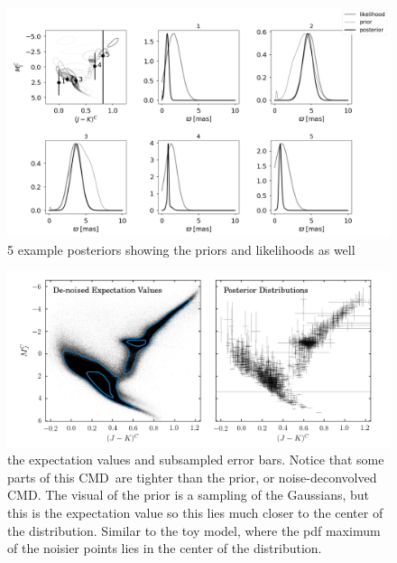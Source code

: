 \documentclass[modern]{aastex61}
\newcommand{\acronym}[1]{{\small{#1}}}
\newcommand{\cmd}{\acronym{CMD}}
\begin{document}
\begin{figure}
\centering
  \includegraphics[width=\textwidth]{posterior.png}
\caption{5 example posteriors showing the priors and likelihoods as well}
\label{fig:posterior}
\end{figure}


\begin{figure}
\centering
  \includegraphics[width=\textwidth]{posteriorCMD.png}
\caption{the expectation values and subsampled error bars. Notice that some parts of this \cmd\ are tighter than the prior, or noise-deconvolved \cmd. The visual of the prior is a sampling of the Gaussians, but this is the expectation value so this lies much closer to the center of the distribution. Similar to the toy model, where the pdf maximum of the noisier points lies in the center of the distribution.}
\label{fig:posteriorCMD}
\end{figure}
\end{document}

